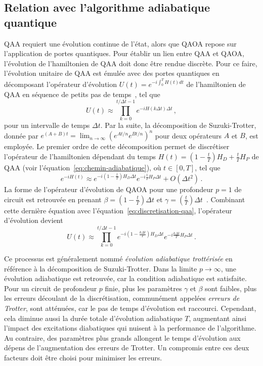 
\subsection{Relation avec l'algorithme adiabatique quantique}
\label{subsec:discretisation-qaoa}

QAA requiert une évolution continue de l'état, alors que QAOA repose sur l'application de portes quantiques. Pour établir un lien entre QAA et QAOA, l'évolution de l'hamiltonien de QAA doit donc être rendue discrète. Pour ce faire, l'évolution unitaire de QAA est émulée avec des portes quantiques en décomposant l'opérateur d'évolution $U(t) = e^{-i \int_{0}^{T} H(t) dt}$ de l'hamiltonien de QAA en séquence de petits pas de temps~\cite{blekosReviewQuantumApproximate2024}, tel que
\begin{equation}
    \label{eq:discretisation-qaa}
    U(t) \approx \prod_{k=0}^{t / \Delta t -1} e^{-i H(k \Delta t) \Delta t} \,,
 \end{equation}
pour un intervalle de temps $\Delta t$. Par la suite, la décomposition de Suzuki-Trotter, donnée par $e^{(A+B)t} = \lim_{n \to \infty} (e^{At / n} e^{Bt / n})^{n}$ pour deux opérateurs $A$ et $B$, est employée. Le premier ordre de cette décomposition permet de discrétiser l'opérateur de l'hamiltonien dépendant du temps $H(t)=(1-\frac{t}{T})H_{D} + \frac{t}{T}H_{P}$ de QAA (voir l'équation~\ref{eq:chemin-adiabatique}), où $t \in [0, T]$, tel que
\begin{equation}
    e^{-i H(t) } \approx e^{-i (1 - \frac{t}{T}) H_D \Delta t} e^{-i \frac{t}{T} H_P \Delta t} + O(\Delta t^2) \,.
\end{equation}
La forme de l'opérateur d'évolution de QAOA pour une profondeur $p=1$ de circuit est retrouvée en prenant $\beta = (1 - \frac{t}{T}) \Delta t$ et $\gamma = (\frac{t}{T}) \Delta t$~\cite{sackQuantumAnnealingInitialization2021}. Combinant cette dernière équation avec l'équation~\ref{eq:discretisation-qaa}, l'opérateur d'évolution devient
\begin{equation}
    U(t) \approx \prod_{k=0}^{t / \Delta t -1} e^{-i (1 - \frac{k \Delta t}{T}) H_{D} \Delta t} e^{- i \frac{k \Delta t}{T} H_{P} \Delta t} \,.
 \end{equation}

 Ce processus est généralement nommé \textit{évolution adiabatique trottérisée} en référence à la décomposition de Suzuki-Trotter. Dans la limite $p \to \infty$, une évolution adiabatique est retrouvée, car la condition adiabatique est satisfaite. Pour un circuit de profondeur $p$ finie, plus les paramètres $\gamma$ et $\beta$ sont faibles, plus les erreurs découlant de la discrétisation, communément appelées \textit{erreurs de Trotter}, sont atténuées, car le pas de temps d'évolution est raccourci. Cependant, cela diminue aussi la durée totale d'évolution adiabatique $T$, augmentant ainsi l'impact des excitations diabatiques qui nuisent à la performance de l'algorithme. Au contraire, des paramètres plus grands allongent le temps d'évolution aux dépens de l'augmentation des erreurs de Trotter. Un compromis entre ces deux facteurs doit être choisi pour minimiser les erreurs.

